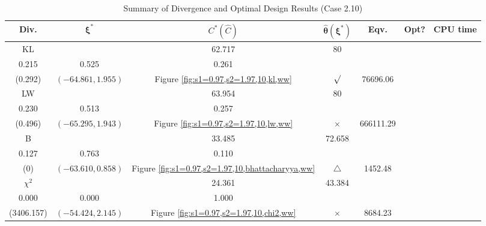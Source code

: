 \documentclass[12pt, a4paper]{article}
\begin{document}
\begin{table}[H]
\centering
\renewcommand{\arraystretch}{1.5} %
\setlength{\tabcolsep}{8pt} %
\begin{tabular}{|c|c|c|c|c|c|c|}
\hline
\textbf{Div.} & \(\boldsymbol{\xi^*}\) & \(C^* (\hat{C})\) & \(\boldsymbol{\hat{\theta}(\xi^*)}\) & \textbf{Eqv.} & \textbf{Opt?} & \textbf{CPU time} \\
\hline
KL & \(\left\{\begin{array}{ccc}
46.469 & 62.717 & 80 \\
0.215 & 0.525 & 0.261
\end{array}\right\}\) &
\(\begin{array}{c}
0.292 \\
(0.292)
\end{array}\) & 
\((-64.861, 1.955)\) & 
Figure \ref{fig:s1=0.97,s2=1.97,10,kl,ww} & $\surd$ & 76696.06 \\
\hline
LW & \(\left\{\begin{array}{ccc}
49.129 & 63.954 & 80 \\
0.230 & 0.513 & 0.257
\end{array}\right\}\) &
\(\begin{array}{c}
0.496 \\
(0.496)
\end{array}\) & 
\((-65.295, 1.943)\) & 
Figure \ref{fig:s1=0.97,s2=1.97,10,lw,ww} & $\times$ & 666111.29 \\
\hline
B & \(\left\{\begin{array}{ccc}
25.219 & 33.485 & 72.658 \\
0.127 & 0.763 & 0.110
\end{array}\right\}\) &
\(\begin{array}{c}
0 \\
(0)
\end{array}\) & 
\((-63.610, 0.858)\) & 
Figure \ref{fig:s1=0.97,s2=1.97,10,bhattacharyya,ww} & $\triangle$ & 1452.48 \\
\hline
\(\chi^2\) & \(\left\{\begin{array}{ccc}
19.485 & 24.361 & 43.384 \\
0.000 & 0.000 & 1.000
\end{array}\right\}\) &
\(\begin{array}{c}
2.529 \\
(3406.157)
\end{array}\) & 
\((-54.424, 2.145)\) & 
Figure \ref{fig:s1=0.97,s2=1.97,10,chi2,ww} & $\times$ & 8684.23 \\
\hline
\end{tabular}
\caption{Summary of Divergence and Optimal Design Results (Case 2.10)}
\label{tab:results2.10}
\end{table}
\end{document}
